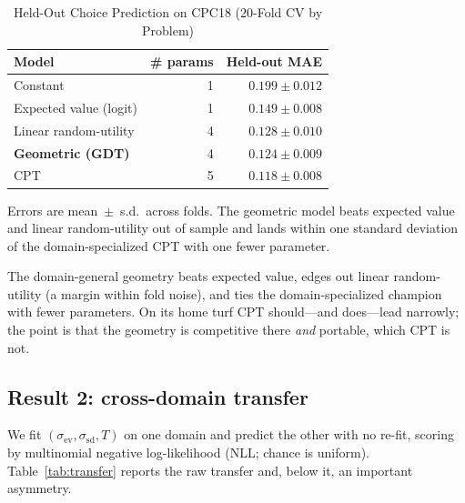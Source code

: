 \documentclass[journal]{IEEEtran}
\begin{document}
\begin{table}[!t]
\renewcommand{\arraystretch}{1.15}
\caption{Held-Out Choice Prediction on CPC18 ($20$-Fold CV by Problem)}
\label{tab:cpc18}
\centering
\begin{tabular}{l r r}
\toprule
\textbf{Model} & \textbf{\# params} & \textbf{Held-out MAE} \\
\midrule
Constant                 & 1 & $0.199 \pm 0.012$ \\
Expected value (logit)   & 1 & $0.149 \pm 0.008$ \\
Linear random-utility    & 4 & $0.128 \pm 0.010$ \\
\textbf{Geometric (GDT)} & 4 & $\mathbf{0.124 \pm 0.009}$ \\
CPT                      & 5 & $0.118 \pm 0.008$ \\
\bottomrule
\end{tabular}
\begin{flushleft}
\footnotesize{Errors are mean~$\pm$~s.d.\ across folds. The geometric model beats expected value and linear random-utility out of sample and lands within one standard deviation of the domain-specialized CPT with one fewer parameter.}
\end{flushleft}
\end{table}

The domain-general geometry beats expected value, edges out linear random-utility (a margin within fold noise), and ties the domain-specialized champion with fewer parameters.
On its home turf CPT should---and does---lead narrowly; the point is that the geometry is competitive there \emph{and} portable, which CPT is not.

\subsection{Result 2: cross-domain transfer}
We fit $(\sigma_{\mathrm{ev}},\sigma_{\mathrm{sd}},T)$ on one domain and predict the other with no re-fit, scoring by multinomial negative log-likelihood (NLL; chance is uniform).
Table~\ref{tab:transfer} reports the raw transfer and, below it, an important asymmetry.
\end{document}
